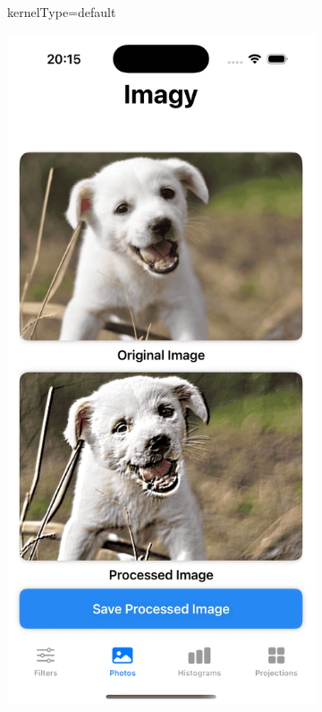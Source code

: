 \documentclass[a4paper]{article}
\begin{document}
\begin{figure}[H]
\begin{subfigure}{0.2\textwidth}
        \caption{kernelType=default}
        \label{fig:dog_embross_default}
    \end{subfigure}
    \hfill
    \begin{subfigure}{0.2\textwidth}
        \centering
        \includegraphics[width=\linewidth]{images/dog_embross_strong.png}

\end{subfigure}
\end{figure}
\end{document}
